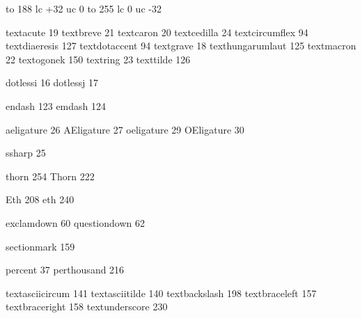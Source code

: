 
\startmapping[qx] %

 to 188 lc +32 uc 0
 to 255 lc 0 uc -32

\stopmapping

\startencoding[qx]

 textacute         19
 textbreve         21
 textcaron         20
 textcedilla       24
 textcircumflex    94
 textdiaeresis    127
 textdotaccent     94
 textgrave         18
 texthungarumlaut 125
 textmacron        22
 textogonek       150
 textring          23
 texttilde        126

 dotlessi          16
 dotlessj          17

 endash           123
 emdash           124

 aeligature        26
 AEligature        27
 oeligature        29
 OEligature        30

 ssharp            25

 thorn            254
 Thorn            222

 Eth              208
 eth              240

 exclamdown        60
 questiondown      62

 sectionmark      159

 percent           37
 perthousand      216

 textasciicircum  141
 textasciitilde   140
 textbackslash    198
 textbraceleft    157
 textbraceright   158
 textunderscore   230

